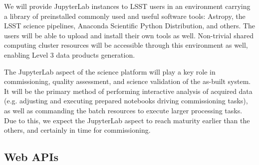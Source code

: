 \documentclass[DM,lsstdraft,toc]{lsstdoc}
\begin{document}
We will provide JupyterLab instances to LSST users in an environment carrying a 
library of preinstalled commonly used and useful software tools:
Astropy, the LSST science pipelines, Anaconda Scientific Python Distribution,
and others. The users will be able to upload and install their own tools as well.
Non-trivial shared computing cluster resources will be accessible through this
environment as well, enabling Level 3 data products generation.


The JupyterLab aspect of the science platform will play a key role in commissioning,
quality assessment, and science validation of the as-built system. It will be the primary
method of performing interactive analysis of acquired data (e.g. adjusting and executing
prepared notebooks driving commissioning tasks), as well as commanding
the batch resources to execute larger processing tasks. Due to this, we expect the
JupyterLab aspect to reach maturity earlier than the others, and certainly in time for
commissioning.


\subsection{Web APIs\label{sec:apis}}
\end{document}
